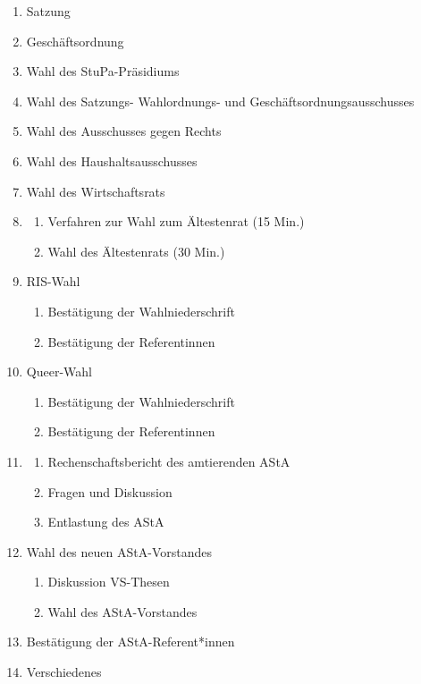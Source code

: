\documentclass[ngerman,headheight=70pt]{scrartcl}
\begin{document}
    \begin{enumerate}[label={\textbf{Top \theenumi}},leftmargin=*]
        \item Satzung
        \item Geschäftsordnung
        \item Wahl des StuPa-Präsidiums
        \item Wahl des Satzungs- Wahlordnungs- und  Geschäftsordnungsausschusses
        \item Wahl des Ausschusses gegen Rechts
        \item Wahl des Haushaltsausschusses
        \item Wahl des Wirtschaftsrats
        \item \begin{enumerate}
                \item Verfahren zur Wahl zum Ältestenrat (15 Min.)
                \item Wahl des Ältestenrats (30 Min.)
            \end{enumerate}
        \item RIS-Wahl
            \begin{enumerate}
                \item Bestätigung der Wahlniederschrift
                \item Bestätigung der Referentinnen
            \end{enumerate}
        \item Queer-Wahl
            \begin{enumerate}
                \item Bestätigung der Wahlniederschrift
                \item Bestätigung der Referentinnen
            \end{enumerate}
        \item \begin{enumerate}
                \item Rechenschaftsbericht des amtierenden AStA
                \item Fragen und Diskussion
                \item Entlastung des AStA
              \end{enumerate}
        \item Wahl des neuen AStA-Vorstandes
            \begin{enumerate}
                \item Diskussion VS-Thesen
                \item Wahl des AStA-Vorstandes
            \end{enumerate}
        \item Bestätigung der AStA-Referent*innen
        \item Verschiedenes
    \end{enumerate}
\end{document}
